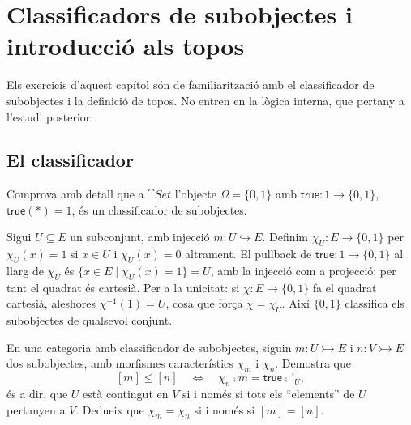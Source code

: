 \chapter[Classificadors de subobjectes i topos]{\texorpdfstring{Classificadors de subobjectes i introducció als topos}{Classificadors de subobjectes i introducció als topos}}

Els exercicis d'aquest capítol són de familiarització amb el classificador de subobjectes i la definició de topos. No entren en la lògica interna, que pertany a l'estudi posterior.

\section{El classificador}

\begin{exercici}
Comprova amb detall que a $\cat{Set}$ l'objecte $\Omega=\{0,1\}$ amb $\mathsf{true}\colon 1\to\{0,1\}$, $\mathsf{true}(\ast)=1$, és un classificador de subobjectes.
\end{exercici}

\begin{solucio}
Sigui $U\subseteq E$ un subconjunt, amb injecció $m\colon U\hookrightarrow E$. Definim $\chi_U\colon E\to\{0,1\}$ per $\chi_U(x)=1$ si $x\in U$ i $\chi_U(x)=0$ altrament. El pullback de $\mathsf{true}\colon 1\to\{0,1\}$ al llarg de $\chi_U$ és $\{x\in E\mid\chi_U(x)=1\}=U$, amb la injecció com a projecció; per tant el quadrat és cartesià. Per a la unicitat: si $\chi\colon E\to\{0,1\}$ fa el quadrat cartesià, aleshores $\chi^{-1}(1)=U$, cosa que força $\chi=\chi_U$. Així $\{0,1\}$ classifica els subobjectes de qualsevol conjunt.
\end{solucio}

\begin{exercici}\label{pr-ordre-pertinenca}
En una categoria amb classificador de subobjectes, siguin $m\colon U\rightarrowtail E$ i $n\colon V\rightarrowtail E$ dos subobjectes, amb morfismes característics $\chi_m$ i $\chi_n$. Demostra que
\[
[m]\leq[n]
\quad\Longleftrightarrow\quad
\chi_n\comp m=\mathsf{true}\comp\,!_U,
\]
és a dir, que $U$ està contingut en $V$ si i només si tots els \enquote{elements} de $U$ pertanyen a $V$. Dedueix que $\chi_m=\chi_n$ si i només si $[m]=[n]$.
\end{exercici}

